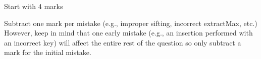 \begin{markingScheme}
Start with 4 marks

Subtract one mark per mistake (e.g., improper sifting, incorrect extractMax, etc.)
   However, keep in mind that one early mistake (e.g., an insertion performed 
   with an incorrect key) will affect the entire rest of the question so only subtract
   a mark for the initial mistake.
\end{markingScheme}

